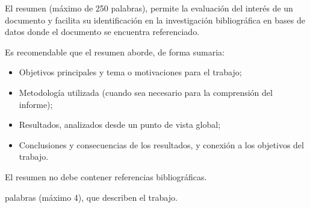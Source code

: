 
El resumen (máximo de 250 palabras), permite la evaluación del interés de un documento y facilita su identificación en la investigación bibliográfica en bases de datos donde el documento se encuentra referenciado.

Es recomendable que el resumen aborde, de forma sumaria:
\begin{itemize}
\item Objetivos principales y tema o motivaciones para el trabajo;
\item Metodología utilizada (cuando sea necesario para la comprensión del informe);
\item Resultados, analizados desde un punto de vista global;
\item Conclusiones y consecuencias de los resultados, y conexión a los objetivos del trabajo.
\end{itemize}


El resumen no debe contener referencias bibliográficas.

\mbox{}\linebreak
{} palabras (máximo 4), que describen el trabajo.


